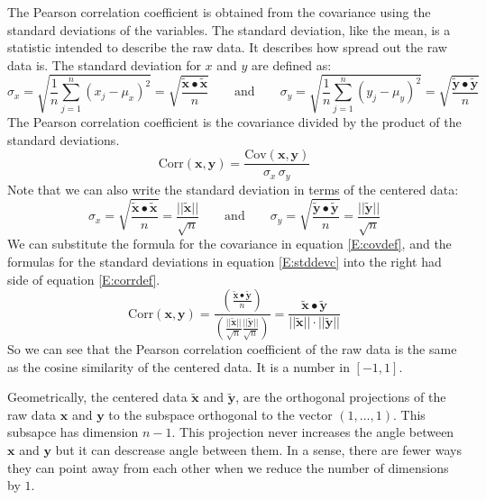    The Pearson correlation coefficient is obtained from the covariance using
the standard deviations of the variables.  The standard deviation, like the 
mean, is a statistic intended to describe the raw data.  It describes how 
spread out the raw data is.  The standard deviation for $x$ and $y$ are defined
as:
\begin{equation}
    \sigma_x = \sqrt{ \frac{1}{n} \sum_{j=1}^n (x_j - \mu_x)^2} = \sqrt{ \frac{\widetilde{\mathbf{x}} \bullet \widetilde{\mathbf{x}}}{n}}
\qquad \mbox{and} \qquad 
    \sigma_y = \sqrt{ \frac{1}{n} \sum_{j=1}^n (y_j - \mu_y)^2} = \sqrt{ \frac{\widetilde{\mathbf{y}} \bullet \widetilde{\mathbf{y}}}{n}}
\end{equation}
The Pearson correlation coefficient is the covariance divided by the product of
the standard deviations.
\begin{equation}\label{E:corrdef}
\mathrm{Corr}(\mathbf{x}, \mathbf{y}) = 
\frac{\mathrm{Cov}(\mathbf{x}, \mathbf{y})}{\sigma_x \, \sigma_y}
\end{equation}
Note that we can also write the standard deviation in terms of the centered data:
\begin{equation}\label{E:stddevc}
  \sigma_x = \sqrt{ \frac{\widetilde{\mathbf{x}} \bullet \widetilde{\mathbf{x}}}{n}}
= \frac{||\widetilde{\mathbf{x}}||}{\sqrt{n}}
\qquad \mbox{and} \qquad 
  \sigma_y = \sqrt{ \frac{\widetilde{\mathbf{y}} \bullet \widetilde{\mathbf{y}}}{n}}
= \frac{||\widetilde{\mathbf{y}}||}{\sqrt{n}}
\end{equation}
We can substitute the formula for the covariance in equation \eqref{E:covdef},
and the formulas for the standard deviations in equation \eqref{E:stddevc}
into the right had side of equation \eqref{E:corrdef}.
\begin{equation}
\mathrm{Corr}(\mathbf{x}, \mathbf{y}) = 
\frac{\left(\displaystyle{\frac{\widetilde{\mathbf{x}} \bullet 
                                                 \widetilde{\mathbf{y}}}{n}}\right)}
     {\left(\displaystyle{\frac{||\widetilde{\mathbf{x}}||}{\sqrt{n}}
               \frac{||\widetilde{\mathbf{y}}||}{\sqrt{n}} }\right)}
= \frac{\widetilde{\mathbf{x}} \bullet \widetilde{\mathbf{y}}}
       {||\widetilde{\mathbf{x}}|| \cdot ||\widetilde{\mathbf{y}}||} 
\end{equation}
So we can see that the Pearson correlation coefficient of the raw data is the
same as the cosine similarity of the centered data.  It is a number in 
$[-1,1]$.  

    Geometrically, the centered data $\widetilde{\mathbf{x}}$ and 
$\widetilde{\mathbf{y}}$, are the orthogonal projections of the raw data 
$\mathbf{x}$ and $\mathbf{y}$ to the subspace orthogonal to the vector 
$(1, \dots, 1)$.  This subsapce has dimension $n - 1$.  This projection 
never increases the angle between $\mathbf{x}$ and $\mathbf{y}$ but it can 
descrease angle between them.  In a sense, there are fewer ways they can point 
away from each other when we reduce the number of dimensions by $1$. 

